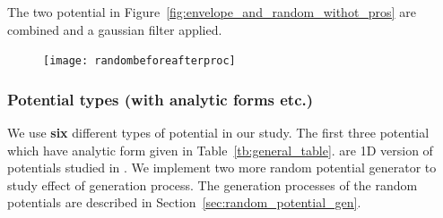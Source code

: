 \documentclass[a4paper,times,hidelinks,12pt]{article}
\begin{document}
The two potential in Figure~\ref{fig:envelope_and_random_withot_pros} are combined and a gaussian filter applied. 

\graphicspath{{"../figs/potentials/"}}
\begin{figure}[H]

    \texttt{[image: randombeforeafterproc]}
\end{figure}




\subsubsection{Potential types (with analytic forms etc.)}

We use \textbf{six} different types of potential in our study. The first three potential which have analytic form given in Table~\ref{tb:general_table}. are 1D version of potentials studied in \cite{mills2017deep}. We implement two more random potential generator to study effect of generation process. The generation processes of the random potentials are described in Section~\ref{sec:random_potential_gen}.

\newcommand{\infinitewell}{$
V(x) = 
    \begin{cases}
       0 &\quad\text{if } x_l < x < x_r  \\
       \infty &\quad\text{if } \textit{otherwise} \\
    \end{cases}
$}

\newcommand{\harmonicpot}{$ V(x) =  \frac{1}{2}m \omega^2 (x - x_0) ^2 $}
\newcommand{\gaussianpot}{$V(x) = -A_1 \exp(\frac{(x - \mu_1)^2}{\sigma_1^2}) -A_2 \exp(\frac{(x - \mu_2)^2}{\sigma_2^2})$}
\newcommand{\randomexplation}{Summation of sines and cosines with random coefficients}
\newcommand{\envelopepotLR}{$\text{Env}_{LR}(x) = [(1 + \tanh{(\beta(x + x_L))}) + (1 - \tanh{(\beta(x + x_R))})]/2$}
\newcommand{\envelopepotM}{$\text{Env}_{M}(x) = 1 - \text{Env}_{LR}(x)$}
\newcommand{\randompotONE}{$V(x_{i+1}) = V(x_i) + [X\sim\mathcal{N}(\mu, \sigma)$]}
\end{document}
